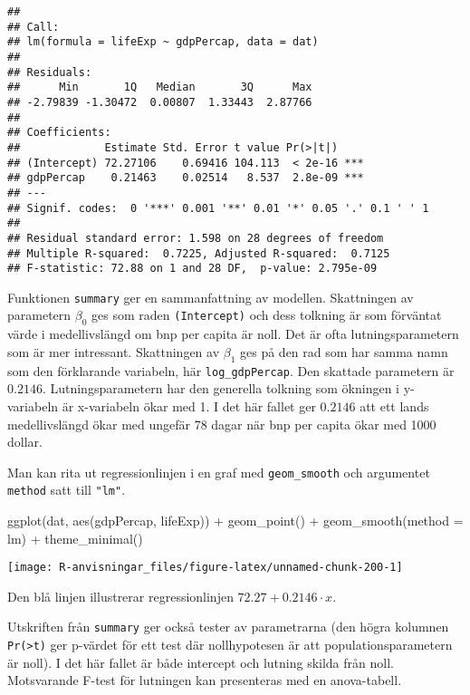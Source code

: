 \documentclass[
]{book}
\newenvironment{Shaded}{\begin{snugshade}}{\end{snugshade}}
\newcommand{\AttributeTok}[1]{\textcolor[rgb]{0.77,0.63,0.00}{#1}}
\newcommand{\FunctionTok}[1]{\textcolor[rgb]{0.00,0.00,0.00}{#1}}
\newcommand{\NormalTok}[1]{#1}
\newcommand{\SpecialCharTok}[1]{\textcolor[rgb]{0.00,0.00,0.00}{#1}}
\theoremstyle{definition}
\theoremstyle{definition}
\theoremstyle{definition}
\theoremstyle{definition}
\theoremstyle{remark}
\begin{document}
\begin{verbatim}
## 
## Call:
## lm(formula = lifeExp ~ gdpPercap, data = dat)
## 
## Residuals:
##      Min       1Q   Median       3Q      Max 
## -2.79839 -1.30472  0.00807  1.33443  2.87766 
## 
## Coefficients:
##             Estimate Std. Error t value Pr(>|t|)    
## (Intercept) 72.27106    0.69416 104.113  < 2e-16 ***
## gdpPercap    0.21463    0.02514   8.537  2.8e-09 ***
## ---
## Signif. codes:  0 '***' 0.001 '**' 0.01 '*' 0.05 '.' 0.1 ' ' 1
## 
## Residual standard error: 1.598 on 28 degrees of freedom
## Multiple R-squared:  0.7225, Adjusted R-squared:  0.7125 
## F-statistic: 72.88 on 1 and 28 DF,  p-value: 2.795e-09
\end{verbatim}

Funktionen \texttt{summary} ger en sammanfattning av modellen. Skattningen av parametern \(\beta_0\) ges som raden \texttt{(Intercept)} och dess tolkning är som förväntat värde i medellivslängd om bnp per capita är noll. Det är ofta lutningsparametern som är mer intressant. Skattningen av \(\beta_1\) ges på den rad som har samma namn som den förklarande variabeln, här \texttt{log\_gdpPercap}. Den skattade parametern är \(0.2146\). Lutningsparametern har den generella tolkning som ökningen i y-variabeln är x-variabeln ökar med 1. I det här fallet ger \(0.2146\) att ett lands medellivslängd ökar med ungefär 78 dagar när bnp per capita ökar med 1000 dollar.

Man kan rita ut regressionlinjen i en graf med \texttt{geom\_smooth} och argumentet \texttt{method} satt till \texttt{"lm"}.

\begin{Shaded}
\begin{Highlighting}[]
\FunctionTok{ggplot}\NormalTok{(dat, }\FunctionTok{aes}\NormalTok{(gdpPercap, lifeExp)) }\SpecialCharTok{+}
  \FunctionTok{geom\_point}\NormalTok{() }\SpecialCharTok{+}
  \FunctionTok{geom\_smooth}\NormalTok{(}\AttributeTok{method =}\NormalTok{ lm) }\SpecialCharTok{+}
  \FunctionTok{theme\_minimal}\NormalTok{()}
\end{Highlighting}
\end{Shaded}

\begin{center}\texttt{[image: R-anvisningar\_files/figure-latex/unnamed-chunk-200-1]} \end{center}

Den blå linjen illustrerar regressionlinjen \(72.27 + 0.2146 \cdot x\).

Utskriften från \texttt{summary} ger också tester av parametrarna (den högra kolumnen \texttt{Pr(\textgreater{}\textbar{}t\textbar{})} ger p-värdet för ett test där nollhypotesen är att populationsparametern är noll). I det här fallet är både intercept och lutning skilda från noll. Motsvarande F-test för lutningen kan presenteras med en anova-tabell.
\end{document}
